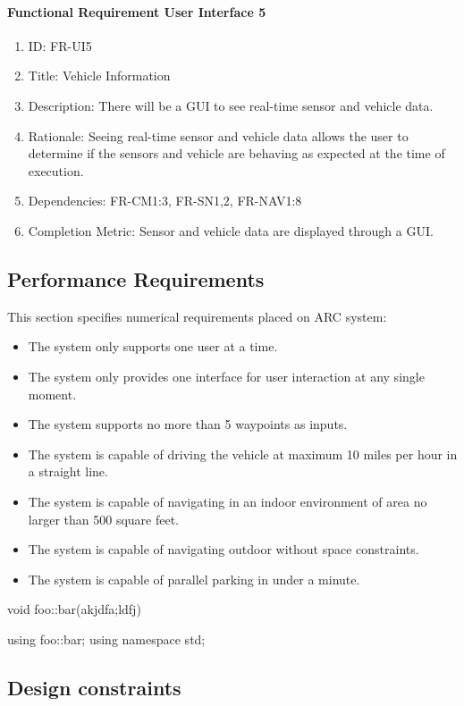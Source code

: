 \documentclass[compsoc,draftclsnofoot,onecolumn,10pt]{IEEEtran}
\begin{document}
	\paragraph{Functional Requirement User Interface 5}
		\begin{enumerate}
			\item ID: FR-UI5
			\item Title: Vehicle Information
			\item Description: There will be a GUI to see real-time sensor and vehicle data.
			\item Rationale: Seeing real-time sensor and vehicle data allows the user to determine if the sensors and vehicle are behaving as expected at the time of execution.
			\item Dependencies: FR-CM1:3, FR-SN1,2, FR-NAV1:8
			\item Completion Metric: Sensor and vehicle data are displayed through a GUI.
		\end{enumerate}

\subsection{Performance Requirements}
This section specifies numerical requirements placed on ARC system:
\begin{itemize}
	\item The system only supports one user at a time.
	\item The system only provides one interface for user interaction at any single moment.
	\item The system supports no more than 5 waypoints as inputs.
	\item The system is capable of driving the vehicle at maximum 10 miles per hour in a straight line.
	\item The system is capable of navigating in an indoor environment of area no larger than 500 square feet.
	\item The system is capable of navigating outdoor without space constraints.
	\item The system is capable of parallel parking in under a minute. 
\end{itemize}

void foo::bar(akjdfa;ldfj)

using foo::bar; 
using namespace std;



\subsection{Design constraints}
\end{document}
